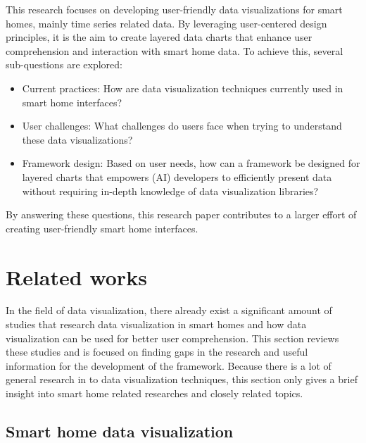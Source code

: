 \documentclass[journal]{IEEEtran}
\begin{document}
This research focuses on developing user-friendly data visualizations for smart homes, mainly time series related data. By leveraging user-centered design principles, it is the aim to create layered data charts that enhance user comprehension and interaction with smart home data. To achieve this, several sub-questions are explored:

\begin{itemize}
\item Current practices: How are data visualization techniques currently used in smart home interfaces?
\item User challenges: What challenges do users face when trying to understand these data visualizations?
\item Framework design: Based on user needs, how can a framework be designed for layered charts that empowers (AI) developers to efficiently present data without requiring in-depth knowledge of data visualization libraries?
\end{itemize}

By answering these questions, this research paper contributes to a larger effort of creating user-friendly smart home interfaces. 

\section{Related works}
In the field of data visualization, there already exist a significant amount of studies that research data visualization in smart homes and how data visualization can be used for better user comprehension. This section reviews these studies and is focused on finding gaps in the research and useful information for the development of the framework. Because there is a lot of general research in to data visualization techniques, this section only gives a brief insight into smart home related researches and closely related topics. 

\subsection{Smart home data visualization}
\end{document}
